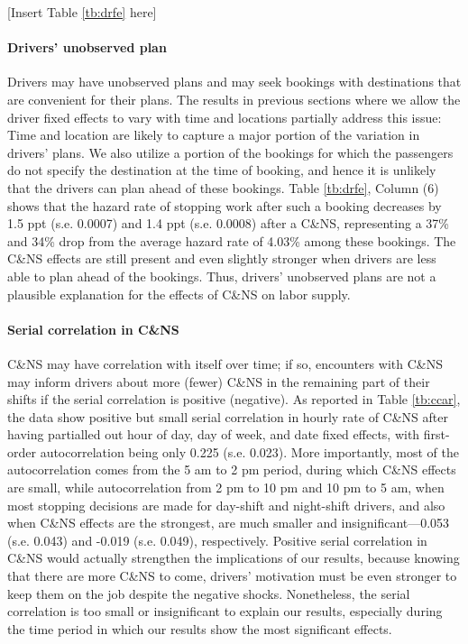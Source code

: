\documentclass[reviewmode,AEJ]{AEA}
\begin{document}
\begin{center}
    [Insert Table \ref{tb:drfe} here]
\end{center}

\paragraph{Drivers' unobserved plan} Drivers may have unobserved plans and may seek bookings with destinations 
that are convenient for their plans. The results in previous sections where we allow the driver fixed effects
to vary with time and locations partially address this issue: Time and location are likely to capture a major
portion of the variation in drivers' plans. We also utilize a portion of the bookings for which the passengers 
do not specify the destination at the time of booking, and hence it is unlikely that the drivers can plan ahead
of these bookings. Table \ref{tb:drfe}, Column (6) shows that the hazard rate of stopping work after such a 
booking decreases by 1.5 ppt (s.e. 0.0007) and 1.4 ppt (s.e. 0.0008) after a C\&NS, representing a 37\% and
34\% drop from the average hazard rate of 4.03\% among these bookings. The C\&NS effects are still present 
and even slightly stronger when drivers are less able to plan ahead of the bookings. Thus, drivers' unobserved
plans are not a plausible explanation for the effects of C\&NS on labor supply.


\paragraph{Serial correlation in C\&NS} C\&NS may have correlation with itself over time; if so, encounters
with C\&NS may inform drivers about more (fewer) C\&NS in the remaining part of their shifts if the serial 
correlation is positive (negative). As reported in Table \ref{tb:ccar}, the data show positive but small 
serial correlation in hourly rate of C\&NS after having partialled out hour of day, day of week, and date 
fixed effects, with first-order autocorrelation being only 0.225 (s.e. 0.023). More importantly, most of 
the autocorrelation comes from the 5 am to 2 pm period, during which C\&NS effects are small, while 
autocorrelation from 2 pm to 10 pm and 10 pm to 5 am, when most stopping decisions are made for day-shift
and night-shift drivers, and also when C\&NS effects are the strongest, are much smaller and insignificant---0.053
(s.e. 0.043) and -0.019 (s.e. 0.049), respectively. Positive serial correlation in C\&NS would actually strengthen
the implications of our results, because knowing that there are more C\&NS to come, drivers' motivation must 
be even stronger to keep them on the job despite the negative shocks. Nonetheless, the serial correlation is
too small or insignificant to explain our results, especially during the time period in which our results 
show the most significant effects.
\end{document}
